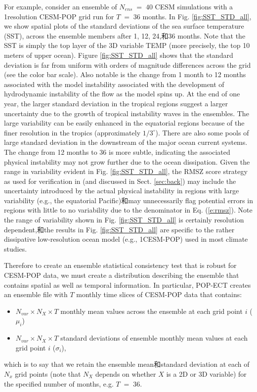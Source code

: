 For example, consider an ensemble of $N_{ens} \;=\; 40$ CESM simulations with a 1\degree\space resolution CESM-POP grid run for $T\;=\;36$ months.  In Fig. \ref{fig:SST_STD_all}, we show spatial plots of the standard deviations of the sea surface temperature (SST), across the ensemble members after 1, 12, 24,和36 months.  Note that the SST is simply the top layer of the 3D variable TEMP (more precisely, the top 10 meters of upper ocean).  Figure \ref{fig:SST_STD_all} shows that the standard deviation is far from uniform with orders of magnitude differences across the grid (see the color bar scale).  Also notable is the change from 1 month to 12 months associated with the model instability 
associated with the development of hydrodynamic instability of the flow as the model spins up.
At the end of one year, the larger standard deviation in the tropical regions suggest a larger uncertainty due to the growth of tropical instability waves \citep{legeckis1977} in the ensembles.  The large variability can be easily enhanced in the equatorial regions because of the finer resolution in the tropics (approximately $1/3^\circ$).  There are also some pools of large standard deviation in the downstream of the major ocean current systems.  The change from 12 months to 36 is more subtle, indicating the associated physical instability may not grow further due to the ocean dissipation.  Given the range in variability evident in Fig. \ref{fig:SST_STD_all}, the RMSZ score strategy as used for verification in \cite{yong2015} (and discussed in Sect. \ref{sec:back}) may include the uncertainty introduced by the actual physical instability in regions with large variability (e.g., the equatorial Pacific)和may unnecessarily flag potential errors in regions with little to no variability due to the denominator in Eq. (\ref{e:rmsz}). 
Note the range of variability shown in Fig. \ref{fig:SST_STD_all} is certainly resolution dependent,和the results in Fig. \ref{fig:SST_STD_all} are specific to the rather dissipative low-resolution ocean model (e.g., 1\degree\space CESM-POP) used in most climate studies.

Therefore to create an ensemble statistical consistency test that is robust for CESM-POP data, we must create a distribution describing the ensemble that contains spatial as well as temporal information. In particular, POP-ECT creates an ensemble file with $T$ monthly time slices of CESM-POP data that contains:  
\begin{itemize}
 \item $N_{var} \times N_X \times T$  monthly mean values across the ensemble at each grid point $i$ ($\mu_i$)
 \item $N_{var} \times N_X \times T$ standard deviations of ensemble monthly mean values at each grid point $i$ ($\sigma_i$),
 \end{itemize}
which is to say that we retain the ensemble mean和standard deviation at each of $N_x$ grid points (note that $N_X$ depends on whether $X$ is a 2D or 3D variable) for the specified number of months, e.g. $T \;=\; 36$.

